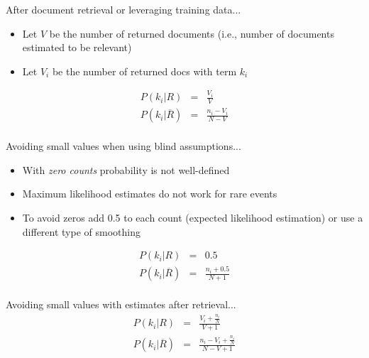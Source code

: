 \documentclass[svgnames]{beamer}
\begin{document}
\begin{frame}[allowframebreaks]
  \begin{block}{After document retrieval or leveraging training data...}
    \begin{itemize}
    \item Let $V$ be the number of returned documents (i.e., number of documents estimated to be relevant)
    \item Let $V_i$ be the number of returned docs with term $k_i$
    \end{itemize}
    \begin{displaymath}
      \begin{array}{rcl}
        P(k_i|R) &=& \frac{V_i}{V}\\
        P(k_i|\overline{R}) &=& \frac{n_i - V_i}{N - V}\\
      \end{array}
    \end{displaymath}    
  \end{block}
  
  \begin{block}{Avoiding small values when using blind assumptions...}
    \begin{itemize}
    \item With \emph{zero counts} probability is not well-defined
    \item Maximum likelihood estimates do not work for rare events
    \item To avoid zeros add 0.5 to each count (expected likelihood estimation) or use a different type of smoothing
    \end{itemize}
    \begin{displaymath}
      \begin{array}{rcl}
        P(k_i|R) &=& 0.5\\
        P(k_i|\overline{R}) &=& \frac{n_i + 0.5}{N + 1}\\
      \end{array}
    \end{displaymath}   
  \end{block}
  
  \begin{block}{Avoiding small values with estimates after retrieval...}
    \begin{displaymath}
      \begin{array}{rcl}
        P(k_i|R) &=& \frac{V_i + \frac{n_i}{N}}{V + 1}\\
        P(k_i|\overline{R}) &=& \frac{n_i - V_i + \frac{n_i}{N}}{N - V + 1}\\
      \end{array}
    \end{displaymath}    
  \end{block}
\end{frame}
\end{document}
